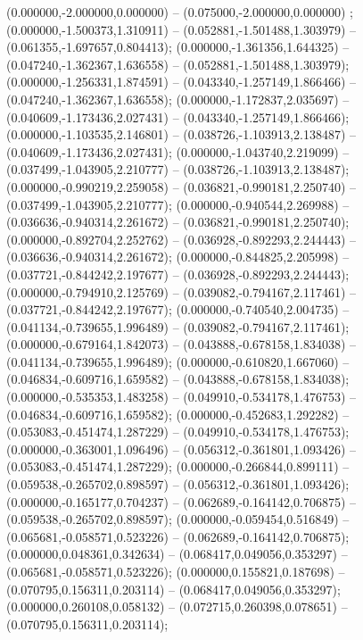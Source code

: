  (0.000000,-2.000000,0.000000) -- (0.075000,-2.000000,0.000000) ;
 (0.000000,-1.500373,1.310911) -- (0.052881,-1.501488,1.303979) -- (0.061355,-1.697657,0.804413);
 (0.000000,-1.361356,1.644325) -- (0.047240,-1.362367,1.636558) -- (0.052881,-1.501488,1.303979);
 (0.000000,-1.256331,1.874591) -- (0.043340,-1.257149,1.866466) -- (0.047240,-1.362367,1.636558);
 (0.000000,-1.172837,2.035697) -- (0.040609,-1.173436,2.027431) -- (0.043340,-1.257149,1.866466);
 (0.000000,-1.103535,2.146801) -- (0.038726,-1.103913,2.138487) -- (0.040609,-1.173436,2.027431);
 (0.000000,-1.043740,2.219099) -- (0.037499,-1.043905,2.210777) -- (0.038726,-1.103913,2.138487);
 (0.000000,-0.990219,2.259058) -- (0.036821,-0.990181,2.250740) -- (0.037499,-1.043905,2.210777);
 (0.000000,-0.940544,2.269988) -- (0.036636,-0.940314,2.261672) -- (0.036821,-0.990181,2.250740);
 (0.000000,-0.892704,2.252762) -- (0.036928,-0.892293,2.244443) -- (0.036636,-0.940314,2.261672);
 (0.000000,-0.844825,2.205998) -- (0.037721,-0.844242,2.197677) -- (0.036928,-0.892293,2.244443);
 (0.000000,-0.794910,2.125769) -- (0.039082,-0.794167,2.117461) -- (0.037721,-0.844242,2.197677);
 (0.000000,-0.740540,2.004735) -- (0.041134,-0.739655,1.996489) -- (0.039082,-0.794167,2.117461);
 (0.000000,-0.679164,1.842073) -- (0.043888,-0.678158,1.834038) -- (0.041134,-0.739655,1.996489);
 (0.000000,-0.610820,1.667060) -- (0.046834,-0.609716,1.659582) -- (0.043888,-0.678158,1.834038);
 (0.000000,-0.535353,1.483258) -- (0.049910,-0.534178,1.476753) -- (0.046834,-0.609716,1.659582);
 (0.000000,-0.452683,1.292282) -- (0.053083,-0.451474,1.287229) -- (0.049910,-0.534178,1.476753);
 (0.000000,-0.363001,1.096496) -- (0.056312,-0.361801,1.093426) -- (0.053083,-0.451474,1.287229);
 (0.000000,-0.266844,0.899111) -- (0.059538,-0.265702,0.898597) -- (0.056312,-0.361801,1.093426);
 (0.000000,-0.165177,0.704237) -- (0.062689,-0.164142,0.706875) -- (0.059538,-0.265702,0.898597);
 (0.000000,-0.059454,0.516849) -- (0.065681,-0.058571,0.523226) -- (0.062689,-0.164142,0.706875);
 (0.000000,0.048361,0.342634) -- (0.068417,0.049056,0.353297) -- (0.065681,-0.058571,0.523226);
 (0.000000,0.155821,0.187698) -- (0.070795,0.156311,0.203114) -- (0.068417,0.049056,0.353297);
 (0.000000,0.260108,0.058132) -- (0.072715,0.260398,0.078651) -- (0.070795,0.156311,0.203114);
